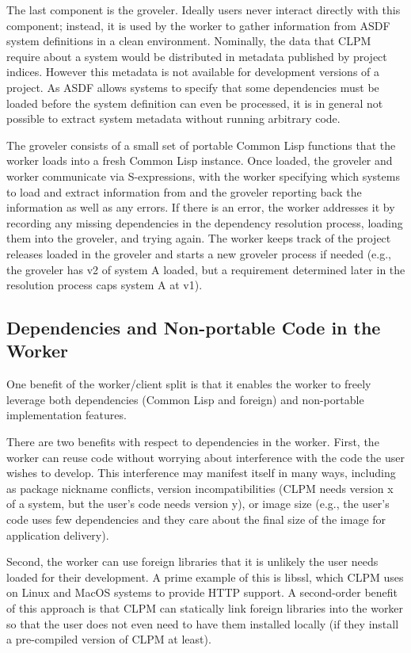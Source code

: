 \documentclass[sigconf]{acmart}
\begin{document}
The last component is the groveler. Ideally users never interact directly with
this component; instead, it is used by the worker to gather information from
ASDF system definitions in a clean environment. Nominally, the data that CLPM
require about a system would be distributed in metadata published by project
indices. However this metadata is not available for development versions of a
project. As ASDF allows systems to specify that some dependencies must be
loaded before the system definition can even be processed, it is in general not
possible to extract system metadata without running arbitrary code.

The groveler consists of a small set of portable Common Lisp functions that the
worker loads into a fresh Common Lisp instance. Once loaded, the groveler and
worker communicate via S-expressions, with the worker specifying which systems
to load and extract information from and the groveler reporting back the
information as well as any errors. If there is an error, the worker addresses
it by recording any missing dependencies in the dependency resolution process,
loading them into the groveler, and trying again. The worker keeps track of the
project releases loaded in the groveler and starts a new groveler process if
needed (e.g., the groveler has v2 of system A loaded, but a requirement
determined later in the resolution process caps system A at v1).

\subsection{Dependencies and Non-portable Code in the Worker}\label{sec:worker-non-portable-code}

One benefit of the worker/client split is that it enables the worker to freely
leverage both dependencies (Common Lisp and foreign) and non-portable
implementation features.

There are two benefits with respect to dependencies in the worker. First, the
worker can reuse code without worrying about interference with the code the
user wishes to develop. This interference may manifest itself in many ways,
including as package nickname conflicts, version incompatibilities (CLPM needs
version x of a system, but the user's code needs version y), or image size
(e.g., the user's code uses few dependencies and they care about the final size
of the image for application delivery).

Second, the worker can use foreign libraries that it is unlikely the user needs
loaded for their development. A prime example of this is libssl, which CLPM
uses on Linux and MacOS systems to provide HTTP support. A second-order benefit
of this approach is that CLPM can statically link foreign libraries into the
worker so that the user does not even need to have them installed locally (if
they install a pre-compiled version of CLPM at least).
\end{document}
